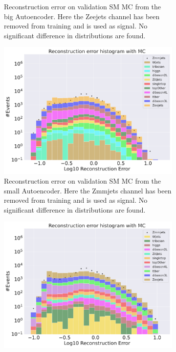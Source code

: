 \begin{figure}[h!]
\begin{subfigure}{.45\textwidth}
        \caption{Reconstruction error on validation SM MC from the big Autoencoder. Here the Zeejets channel has been removed from training and 
        is used as signal. No significant difference in distributions are found. }
        \label{fig:vae_big_Zeejets}
    \end{subfigure}
    \hfill 
    \begin{subfigure}{.45\textwidth}
        \includegraphics[width=\textwidth]{Figures/VAE_testing/small/b_data_recon_big_rm3_feats_sig_Zmmjets.pdf}
        \caption{Reconstruction error on validation SM MC from the small Autoencoder. Here the Zmmjets channel has been removed from training and 
        is used as signal. No significant difference in distributions are found. }
        \label{fig:vae_small_Zmmjets}
    \end{subfigure}
    \hfill
    \begin{subfigure}{.45\textwidth}
        \includegraphics[width=\textwidth]{Figures/VAE_testing/big/b_data_recon_big_rm3_feats_sig_Zmmjets.pdf}

\end{subfigure}
\end{figure}
